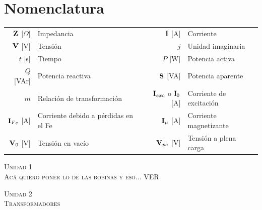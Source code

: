 \documentclass[11pt,a4paper]{article}
\newcommand{\fasor}[1]{\uppercase{\textbf{#1}}}
\newcommand{\unidad}[2]{\begin{center}
		\fontsize{10}{10}\selectfont\color{gray!50!black}\scshape Unidad #1 \\
		\fontsize{14}{14}\selectfont \scshape #2
	\end{center} \vspace{-.6cm}}
\begin{document}
	\pagestyle{fancy}
	\section*{Nomenclatura}
	
	\begin{tabular}{r l r l}
		$\fasor{Z}$ [$\Omega$]& Impedancia &
		$\fasor{i}$ [A] & Corriente \\
		$\fasor{v}$ [V] & Tensión&
		$j$ & Unidad imaginaria \\
		$t$ [s] & Tiempo &
		$P$ [W] & Potencia activa \\
		$Q$ [VAr] & Potencia reactiva &
		$\fasor{s}$ [VA] & Potencia aparente \\
		$m$ & Relación de transformación&
		$\fasor{I}_{exc}$ o $\fasor{I}_0$ [A] & Corriente de excitación\\
		$\fasor{I}_{Fe}$ [A] & Corriente debido a pérdidas en el Fe&
		$\fasor{I}_{\mu}$ [A] & Corriente magnetizante\\
		$\fasor{v}_0$ [V] & Tensión en vacío & $\fasor{v}_{pc}$ [V] & Tensión a plena carga \\
	\end{tabular}
	\unidad{1}{Acá quiero poner lo de las bobinas y eso... VER}
	\unidad{2}{Transformadores}
	
\end{document}
